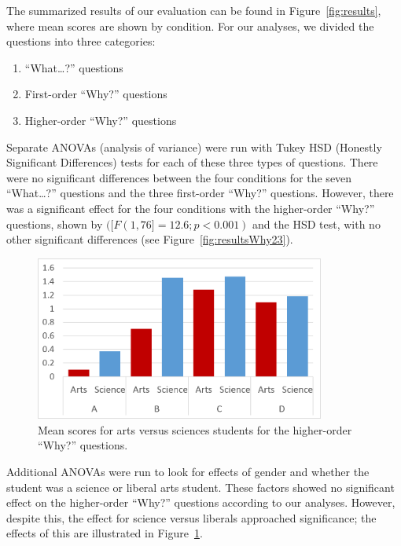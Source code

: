 The summarized results of our evaluation can be found in Figure~\ref{fig:results}, where mean scores are shown by condition.  For our analyses, we divided the questions into three categories:
\begin{enumerate}
\item ``What\ldots?'' questions
\item First-order ``Why?'' questions
\item Higher-order ``Why?'' questions
\end{enumerate}
Separate ANOVAs (analysis of variance) were run with Tukey HSD (Honestly Significant Differences) tests for each of these three types of questions.  There were no significant differences between the four conditions for the seven ``What\ldots?'' questions and the three first-order ``Why?'' questions.    However, there was a significant effect for the four conditions with the higher-order ``Why?'' questions, shown by $([F(1, 76] = 12.6; p < 0.001)$ and the HSD test, with no other significant differences (see Figure~\ref{fig:resultsWhy23}).

\begin{figure}[h]
	\centering
	\includegraphics[width=0.85\textwidth]{figures/png/results_arts_science.png}
	\caption{Mean scores for arts versus sciences students for the higher-order ``Why?'' questions.}
	\label{fig:results_arts_science}
\end{figure}

Additional ANOVAs were run to look for effects of gender and whether the student was a science or liberal arts student.  These factors showed no significant effect on the higher-order ``Why?'' questions according to our analyses.  However, despite this, the effect for science versus liberals approached significance; the effects of this are illustrated in Figure~\ref{fig:results_arts_science}.  %

